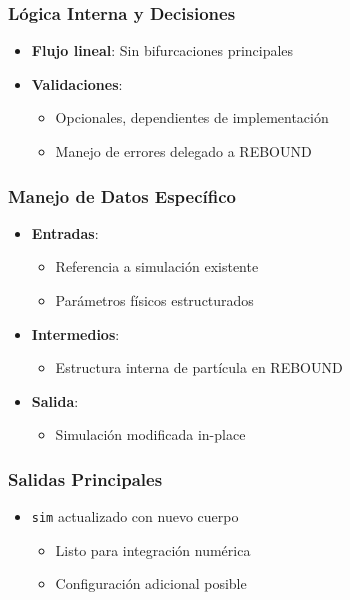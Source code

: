 \subsubsection{Lógica Interna y Decisiones}
\begin{itemize}
    \item \textbf{Flujo lineal}: Sin bifurcaciones principales
    \item \textbf{Validaciones}:
    \begin{itemize}
        \item Opcionales, dependientes de implementación
        \item Manejo de errores delegado a REBOUND
    \end{itemize}
\end{itemize}

\subsubsection{Manejo de Datos Específico}
\begin{itemize}
    \item \textbf{Entradas}:
    \begin{itemize}
        \item Referencia a simulación existente
        \item Parámetros físicos estructurados
    \end{itemize}
    \item \textbf{Intermedios}:
    \begin{itemize}
        \item Estructura interna de partícula en REBOUND
    \end{itemize}
    \item \textbf{Salida}:
    \begin{itemize}
        \item Simulación modificada in-place
    \end{itemize}
\end{itemize}

\subsubsection{Salidas Principales}
\begin{itemize}
    \item \texttt{sim} actualizado con nuevo cuerpo
    \begin{itemize}
        \item Listo para integración numérica
        \item Configuración adicional posible
    \end{itemize}
\end{itemize}

